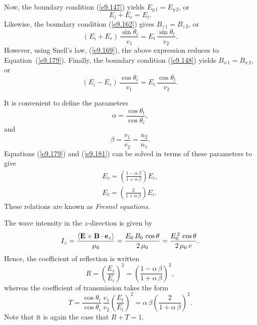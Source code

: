 Now, the boundary condition (\ref{e9.147}) yields $E_{y\,1} = E_{y\,2}$,
or
\begin{equation}\label{e9.179}
E_i + E_r = E_t.
\end{equation}
Likewise, the boundary condition (\ref{e9.162}) gives $B_{z\,1} = B_{z\,2}$,
or
\begin{equation}
(E_i + E_r)\,\frac{\sin\theta_i}{v_1} = E_t\,\frac{\sin\theta_t}{v_2}.
\end{equation}
However, using Snell's law, (\ref{e9.169}), the above expression reduces to Equation~(\ref{e9.179}). Finally, the boundary condition (\ref{e9.148}) yields
$B_{x\,1} = B_{x\,2}$, or
\begin{equation}\label{e9.181}
(E_i -E_r)\,\frac{\cos\theta_i}{v_1} = E_t\,\frac{\cos\theta_t}{v_2}.
\end{equation}

It is convenient to define the parameters
\begin{equation}\label{e9.182x}
\alpha =\frac{\cos\theta_t}{\cos\theta_i},
\end{equation}
and
\begin{equation}\label{e9.183x}
\beta = \frac{v_1}{v_2}= \frac{n_2}{n_1}.
\end{equation}
Equations (\ref{e9.179}) and (\ref{e9.181}) can be solved in terms
of these parameters to give
\begin{eqnarray}\label{e9.184}
E_r = \left(\frac{1-\alpha\,\beta}{1+\alpha\,\beta}\right) E_i,\\[0.5ex]
E_t = \left(\frac{2}{1+\alpha\,\beta}\right) E_i.\label{e9.185}
\end{eqnarray}
These relations are known as {\em Fresnel equations}.

The wave intensity in the $z$-direction is given by
\begin{equation}
I_z =\frac{\langle {\bf E}\times{\bf B}\cdot{\bf e}_z\rangle}{\mu_0}= \frac{E_0\,B_0\,\cos\theta}{2\,\mu_0} = \frac{E_0^{\,2}\,\cos\theta}{2\,\mu_0\,v}.
\end{equation}
Hence, the coefficient of reflection is written
\begin{equation}
R = \left(\frac{E_r}{E_i}\right)^2 = \left(\frac{1-\alpha\,\beta}{1+\alpha\,\beta}\right)^2,
\end{equation}
whereas the coefficient of transmission takes the form
\begin{equation}
T = \frac{\cos\theta_t}{\cos\theta_i}\,\frac{v_1}{v_2}\left(
\frac{E_t}{E_i}\right)^2 = \alpha\,\beta \left(\frac{2}{1+\alpha\,\beta}\right)^2.
\end{equation}
Note that it is again the case that $R+T=1$. 

